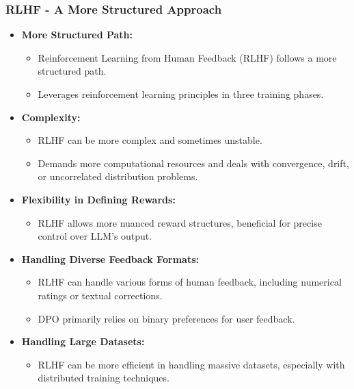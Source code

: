 \begin{frame}[fragile]\frametitle{RLHF - A More Structured Approach}
  \begin{itemize}
    \item \textbf{More Structured Path:}
      \begin{itemize}
        \item Reinforcement Learning from Human Feedback (RLHF) follows a more structured path.
        \item Leverages reinforcement learning principles in three training phases.
      \end{itemize}
    \item \textbf{Complexity:}
      \begin{itemize}
        \item RLHF can be more complex and sometimes unstable.
        \item Demands more computational resources and deals with convergence, drift, or uncorrelated distribution problems.
      \end{itemize}
    \item \textbf{Flexibility in Defining Rewards:}
      \begin{itemize}
        \item RLHF allows more nuanced reward structures, beneficial for precise control over LLM's output.
      \end{itemize}
    \item \textbf{Handling Diverse Feedback Formats:}
      \begin{itemize}
        \item RLHF can handle various forms of human feedback, including numerical ratings or textual corrections.
        \item DPO primarily relies on binary preferences for user feedback.
      \end{itemize}
    \item \textbf{Handling Large Datasets:}
      \begin{itemize}
        \item RLHF can be more efficient in handling massive datasets, especially with distributed training techniques.
      \end{itemize}
  \end{itemize}
\end{frame}

